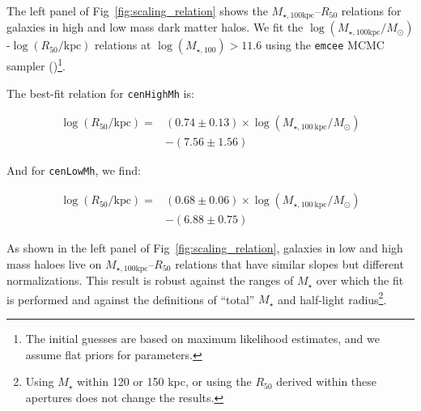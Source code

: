 \documentclass[a4paper,fleqn,usenatbib]{mnras}
\def\rbcg{\texttt{cenHighMh}}
\def\nbcg{\texttt{cenLowMh}}
\def\mstar{{$M_{\star}$}}
\def\mtot{{$M_{\star,100\mathrm{kpc}}$}}
\def\logmtot{{$\log (M_{\star,100\mathrm{kpc}}/M_{\odot})$}}
\begin{document}
    The left panel of Fig~\ref{fig:scaling_relation} shows the \mtot{}--$R_{\mathrm{50}}$
    relations for galaxies in high and low mass dark matter halos. We fit the \logmtot{}-$\log (R_{\mathrm{50}}/\mathrm{kpc})$ relations at $\log(M_{\star,100})>11.6$ using the \texttt{emcee} MCMC sampler (\citealt{Emcee})\footnote{The initial guesses are based on maximum 
    likelihood estimates, and we assume flat priors for parameters.}.
    
    The best-fit relation for \rbcg{} is:
    
    \begin{equation}
        \begin{aligned}
        \log (R_{\mathrm{50}}/\mathrm{kpc}) = & (0.74\pm0.13) \times \log (M_{\star, 100\ \mathrm{kpc}}/M_{\odot}) \\ & -(7.56\pm1.56)
        \end{aligned}
    \end{equation}

    \noindent And for \nbcg{}, we find:
    
    \begin{equation}
        \begin{aligned}
        \log (R_{\mathrm{50}}/\mathrm{kpc}) = & (0.68\pm0.06) \times \log (M_{\star, 100\ \mathrm{kpc}}/M_{\odot}) \\ & -(6.88\pm0.75)
        \end{aligned}
    \end{equation}
    
    \noindent As shown in the left panel of Fig~\ref{fig:scaling_relation}, galaxies in low and high mass haloes live on \mtot{}--$R_{\mathrm{50}}$ relations that have similar slopes but different normalizations. This result is robust against the ranges of \mstar{} over which the fit is performed and against the definitions 
    of  ``total'' \mstar{} and half-light radius\footnote{Using \mstar{} within 120 or 
    150 kpc, or using the $R_{\mathrm{50}}$ derived within these apertures does not 
    change the results.}.
    
\end{document}
